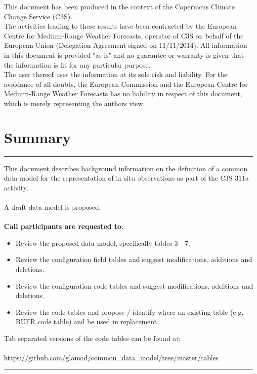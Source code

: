 \documentclass[a4paper]{article}
\newcounter{FramedDepth}
\newenvironment{Framed}{%
  \addtocounter{FramedDepth}{1}
  \ifcase\theFramedDepth\def\FrameColour{white!50}%
    \or\def\FrameColour{white!50}%
    \or\def\FrameColour{white!50}%
    \or\def\FrameColour{white!50}%
    \fi%
  \begin{mdframed}[style=Framed,backgroundcolor=\FrameColour]%
}{\end{mdframed}\addtocounter{FramedDepth}{-1}}
\begin{document}
\vspace*{\fill}
\begin{Framed}
This document has been produced in the context of the Copernicus Climate Change Service (C3S).\\
The activities leading to these results have been contracted by the European Centre for Medium-Range Weather Forecasts, operator of C3S on behalf of the European Union (Delegation Agreement signed on 11/11/2014). All information in this document is provided "as is" and no guarantee or warranty is given that the information is fit for any particular purpose.\\
The user thereof uses the information at its sole risk and liability. For the avoidance of all doubts, the European Commission
and the European Centre for Medium-Range Weather Forecasts has no liability in respect of this document, which is merely representing the authors view.
\end{Framed}

\newpage

\maketitle

\vskip 0.25in
\section*{Summary}
\hrule
\vskip 0.25in
This document describes background information on the definition of a common data model for the representation of in situ observations as part of the C3S 311a activity.\\ \\
A draft data model is proposed.\\ \\
\textbf{Call participants are requested to}:\\
\begin{itemize}
\item Review the proposed data model, specifically tables 3 - 7.
\item Review the configuration field tables and suggest modifications, additions and deletions.
\item Review the configuration code tables and suggest modifications, additions and deletions.
\item Review the code tables and propose / identify where an existing table (e.g. BUFR code table) and be used in replacement.
\end{itemize}
\vskip 0.25in
Tab separated versions of the code tables can be found at:\\ \\
\tabto{2cm} \url{https://github.com/glamod/common_data_model/tree/master/tables}
\vskip 0.25in
\hrule
\end{document}
